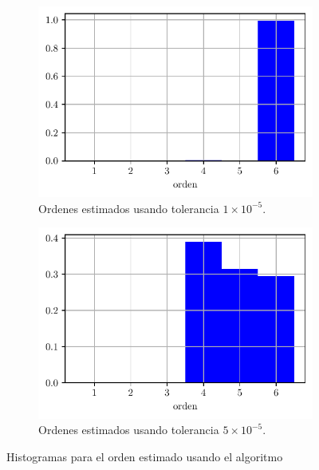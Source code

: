 	\begin{figure}
		\centering
		\begin{subfigure}{0.45\linewidth}
			\centering
			\includegraphics[width = \linewidth]{Figuras/orden_pade_svd_1e5.pdf}
			\caption{Ordenes estimados usando tolerancia \hspace*{1cm}$1\times10^{-5}$.}
			\label{fig:Hist_pade1}
		\end{subfigure}
		\begin{subfigure}{0.45\linewidth}
			\centering
			\includegraphics[width = \linewidth]{Figuras/orden_pade_svd_5e5.pdf}
			\caption{Ordenes estimados usando tolerancia \hspace*{1cm}$5\times10^{-5}$.}
			\label{fig:Hist_pade2}	
		\end{subfigure}
		\caption{Histogramas para el orden estimado usando el algoritmo \cite{Gonnet2013}}
		\label{fig:Hist_pade}
	\end{figure}

